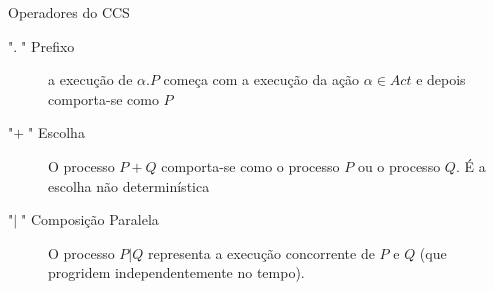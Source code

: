 \documentclass[aspectratio=169]{beamer}
\begin{document}


\begin{frame}{Operadores do CCS}
\begin{description}
\item["$.\;$" Prefixo ] a execução de $\alpha.P$ começa com a execução da ação $\alpha\in Act$ e depois comporta-se como $P$	
\item["$+\;$" Escolha ] O processo $P+Q$ comporta-se como o processo $P$ ou o processo $Q$. É a escolha não determinística
\item[\alert{"$|\;$"  Composição Paralela} ]
O processo $P| Q$ representa a execução concorrente de $P$ e $Q$ (que progridem independentemente no tempo). 
\end{description}
\end{frame}
\end{document}
